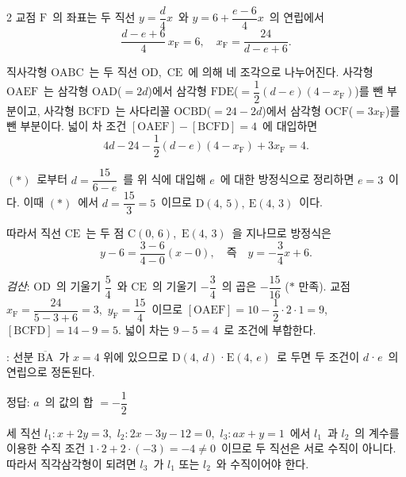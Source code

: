 \documentclass[10pt,fleqn]{article}
\begin{document}
\begin{multicols*}{2}
교점 $\mathrm{F}$\ 의 좌표는 두 직선 $y = \dfrac{d}{4}x$\ 와 $y = 6 + \dfrac{e-6}{4}x$\ 의 연립에서
\[ \dfrac{d - e + 6}{4}\, x_{\mathrm{F}} = 6,\quad x_{\mathrm{F}} = \dfrac{24}{d - e + 6}. \]

직사각형 $\mathrm{OABC}$\ 는 두 직선 $\mathrm{OD}$,\ $\mathrm{CE}$\ 에 의해 네 조각으로 나누어진다. 사각형 $\mathrm{OAEF}$\ 는 삼각형 $\mathrm{OAD}$($=2d$)에서 삼각형 $\mathrm{FDE}$($=\dfrac{1}{2}(d-e)(4-x_{\mathrm{F}})$)를 뺀 부분이고, 사각형 $\mathrm{BCFD}$\ 는 사다리꼴 $\mathrm{OCBD}$($=24-2d$)에서 삼각형 $\mathrm{OCF}$($=3x_{\mathrm{F}}$)를 뺀 부분이다.
넓이 차 조건 $[\mathrm{OAEF}] - [\mathrm{BCFD}] = 4$\ 에 대입하면
\[ 4d - 24 - \dfrac{1}{2}(d - e)(4 - x_{\mathrm{F}}) + 3 x_{\mathrm{F}} = 4. \]

$(\ast)$\ 로부터 $d = \dfrac{15}{6 - e}$\ 를 위 식에 대입해 $e$\ 에 대한 방정식으로 정리하면 $e = 3$\ 이다. 이때 $(\ast)$\ 에서 $d = \dfrac{15}{3} = 5$\ 이므로 $\mathrm{D}(4,\, 5),\ \mathrm{E}(4,\, 3)$\ 이다.

따라서 직선 $\mathrm{CE}$\ 는 두 점 $\mathrm{C}(0,\, 6)$,\ $\mathrm{E}(4,\, 3)$\ 을 지나므로 방정식은
\[ y - 6 = \dfrac{3 - 6}{4 - 0}(x - 0),\quad \text{즉}\quad y = -\dfrac{3}{4}x + 6. \]

\emph{검산}: $\mathrm{OD}$\ 의 기울기 $\dfrac{5}{4}$\ 와 $\mathrm{CE}$\ 의 기울기 $-\dfrac{3}{4}$\ 의 곱은 $-\dfrac{15}{16}$ ($\ast$ 만족). 교점 $x_{\mathrm{F}} = \dfrac{24}{5 - 3 + 6} = 3$,\ $y_{\mathrm{F}} = \dfrac{15}{4}$\ 이므로 $[\mathrm{OAEF}] = 10 - \dfrac{1}{2} \cdot 2 \cdot 1 = 9$,\ $[\mathrm{BCFD}] = 14 - 9 = 5$. 넓이 차는 $9 - 5 = 4$\ 로 조건에 부합한다.

\begin{dmcriticalpoint}
: 선분 $\overline{\mathrm{BA}}$\ 가 $x = 4$ 위에 있으므로 $\mathrm{D}(4,\, d)$·$\mathrm{E}(4,\, e)$\ 로 두면 두 조건이 $d$·$e$\ 의 연립으로 정돈된다.
\end{dmcriticalpoint}

\begin{dmanswerbox}
정답: $a$\ 의 값의 합 $= -\dfrac{1}{2}$
\end{dmanswerbox}

세 직선 $l_1 : x + 2y = 3$,\ $l_2 : 2x - 3y - 12 = 0$,\ $l_3 : ax + y = 1$\ 에서 $l_1$\ 과 $l_2$\ 의 계수를 이용한 수직 조건 $1 \cdot 2 + 2 \cdot (-3) = -4 \ne 0$\ 이므로 두 직선은 서로 수직이 아니다. 따라서 직각삼각형이 되려면 $l_3$\ 가 $l_1$ 또는 $l_2$\ 와 수직이어야 한다.


\end{multicols*}
\end{document}
